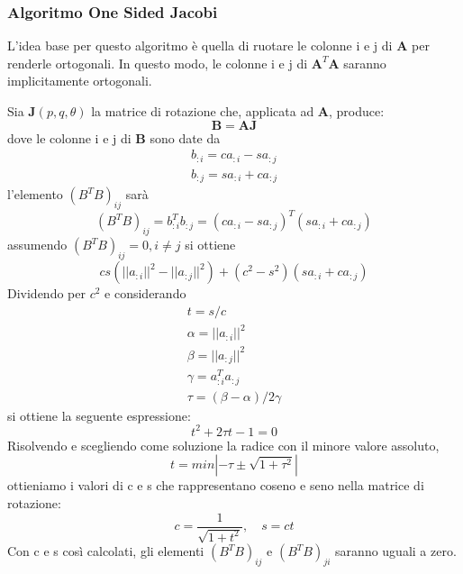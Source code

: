 \subsubsection{Algoritmo One Sided Jacobi}
\label{sec:Algoritmo_One_Sided_Jacobi}
L'idea base per questo algoritmo è quella di ruotare le colonne i e j di $\mathbf{A}$ per renderle ortogonali. In questo modo, le colonne i e j di $\mathbf{A}^T\mathbf{A}$ saranno implicitamente ortogonali.

Sia $\mathbf{J}(p,q,\theta)$ la matrice di rotazione che, applicata ad $\mathbf{A}$, produce:
\begin{equation}
\mathbf{B}=\mathbf{AJ}
\end{equation}
dove le colonne i e j di $\mathbf{B}$ sono date da
\begin{eqnarray}
b_{:i}=ca_{:i}-sa_{:j}\\
b_{:j}=sa_{:i}+ca_{:j}
\end{eqnarray}
l'elemento $(B^TB)_{ij}$ sarà
\[
(B^TB)_{ij}=b_{:i}^Tb_{:j}=(ca_{:i}-sa_{:j})^T(sa_{:i}+ca_{:j})
\]
assumendo $(B^TB)_{ij}=0,i\neq j$ si ottiene
\[
cs(||a_{:i}||^2-||a_{:j}||^2)+(c^2-s^2)(sa_{:i}+ca_{:j})
\]
Dividendo per $c^2$ e considerando
\begin{equation*}
\begin{aligned}
t=s/c\\
\alpha = ||a_{:i}||^2\\
\beta = ||a_{:j}||^2\\
\gamma = a_{:i}^Ta_{:j}\\
\tau =(\beta - \alpha)/2\gamma
\end{aligned}
\end{equation*}
si ottiene la seguente espressione:
\begin{equation}
t^2+2\tau t-1=0
\end{equation}
Risolvendo e scegliendo come soluzione la radice con il minore valore assoluto,
\begin{equation}
t=min|-\tau\pm\sqrt{1+\tau^2}|
\end{equation}
ottieniamo i valori di c e s che rappresentano coseno e seno nella matrice di rotazione:
\begin{equation}
c=\frac{1}{\sqrt{1+t^2}},\quad s=ct
\end{equation}
Con c e s così calcolati, gli elementi $(B^TB)_{ij}$ e $(B^TB)_{ji}$ saranno uguali a zero.\cite{Turchetti:SVDAlgorithms}



